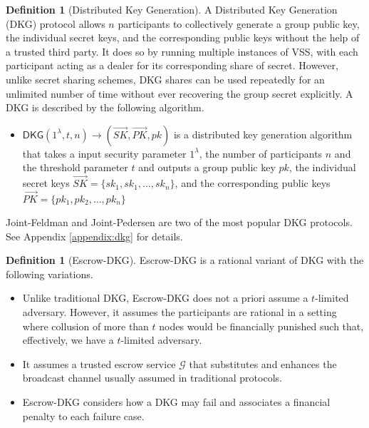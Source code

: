 \documentclass[letterpaper,twocolumn,10pt]{article}
\theoremstyle{definition}
\newtheorem{definition}[theorem]{Definition}
\theoremstyle{remark}
\begin{document}
\begin{definition}[Distributed Key Generation]
A Distributed Key Generation (DKG) \cite{gennaro1999secure, gennaro3revisiting} protocol allows $n$ participants to collectively generate a group public key, the individual secret keys, and the corresponding public keys without the help of a trusted third party. It does so by running multiple instances of VSS, with each participant acting as a dealer for its corresponding share of secret. However, unlike secret sharing schemes, DKG shares can be used repeatedly for an unlimited number of time without ever recovering the group secret explicitly. A DKG is described by the following algorithm.
\begin{itemize}
    \item $\mathsf{DKG}(1^{\lambda}, t, n) \rightarrow (\vec{SK}, \vec{PK}, pk)$ is a distributed key generation algorithm that takes a input security parameter $1^\lambda$, the number of participants $n$ and the threshold parameter $t$ and outputs a group public key $pk$, the individual secret keys $\vec{SK} = \{sk_1, sk_1, \ldots, sk_n\}$, and the corresponding public keys $\vec{PK} = \{pk_1, pk_2, \ldots, pk_n\}$
\end{itemize}
Joint-Feldman and Joint-Pedersen are two of the most popular DKG protocols. See Appendix \ref{appendix:dkg} for details.
\end{definition}

\begin{definition}[Escrow-DKG]
Escrow-DKG \cite{david2019rational} is a rational variant of DKG with the following variations.
\begin{itemize}
    \item Unlike traditional DKG, Escrow-DKG does not a priori assume a $t$-limited adversary. However, it assumes the participants are rational in a setting where collusion of more than $t$ nodes would be financially punished such that, effectively, we have a $t$-limited adversary.
    \item It assumes a trusted escrow service $\mathcal{G}$ that substitutes and enhances the broadcast channel usually assumed in traditional protocols.
    \item Escrow-DKG considers how a DKG may fail and associates a financial penalty to each failure case.
\end{itemize}
\end{definition}
\end{document}
